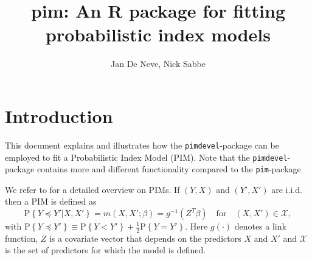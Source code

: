 \documentclass[12pt]{article}
\author{Jan De Neve, Nick Sabbe}
\newcommand{\prob}[1]{\text{P}\left\{#1\right\}}
\newcommand{\leqs}{\preccurlyeq}
\newcommand{\pim}[1]{\texttt{#1}}%
\begin{document}

\title{pim: An R package for fitting probabilistic index models}

\maketitle
\tableofcontents
\section{Introduction}\label{S_intro}

This document explains and illustrates how the \pim{pimdevel}-package can be employed to fit a Probabilistic Index Model (PIM). Note that the \pim{pimdevel}-package contains more and different functionality compared to the \pim{pim}-package

We refer to \cite{Thas2012} for a detailed overview on PIMs. If $(Y,X)$ and $(Y',X')$ are i.i.d. then a PIM is defined as
\begin{equation}\label{pim}
\prob{Y \leqs Y' | X, X'} = m(X,X';\beta) = g^{-1}(Z^T \beta) \quad \text{for} \quad (X,X') \in \mathcal{X},
\end{equation}
with $\prob{Y \leqs Y'} \equiv  \prob{Y < Y'} + \frac{1}{2} \prob{Y = Y'}$. Here $g(\cdot)$ denotes a link function, $Z$ is a covariate vector that depends on the predictors $X$ and $X'$ and $\mathcal{X}$ is the set of predictors for which the model is defined. 
\end{document}
